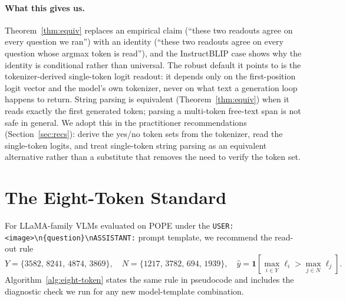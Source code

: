 \documentclass[11pt,letterpaper]{article}
\begin{document}
\paragraph{What this gives us.} Theorem~\ref{thm:equiv} replaces an
empirical claim (``these two readouts agree on every question we
ran'') with an identity (``these two readouts agree on every question
whose argmax token is read''), and the InstructBLIP case shows why the
identity is conditional rather than universal. The robust default it
points to is the tokenizer-derived single-token logit readout: it
depends only on the first-position logit vector and the model's own
tokenizer, never on what text a generation loop happens to return.
String parsing is equivalent (Theorem~\ref{thm:equiv}) when it reads
exactly the first generated token; parsing a multi-token free-text span
is not safe in general. We adopt this in the practitioner
recommendations (Section~\ref{sec:recs}): derive the yes/no token sets
from the tokenizer, read the single-token logits, and treat single-token
string parsing as an equivalent alternative rather than a substitute
that removes the need to verify the token set.

\section{The Eight-Token Standard}
\label{sec:standard}
\label{sec:discussion}

For LLaMA-family VLMs evaluated on POPE under the
\texttt{USER:\,<image>\textbackslash n\{question\}\textbackslash nASSISTANT:}
prompt template, we recommend the read-out rule
\begin{equation}
Y = \{3582,\, 8241,\, 4874,\, 3869\},\quad
N = \{1217,\, 3782,\, 694,\, 1939\},\quad
\hat{y} = \mathbf{1}\!\left[\max_{i \in Y} \ell_i > \max_{j \in N} \ell_j\right].
\label{eq:rule}
\end{equation}
Algorithm~\ref{alg:eight-token} states the same rule in pseudocode and
includes the diagnostic check we run for any new model-template
combination.
\end{document}
